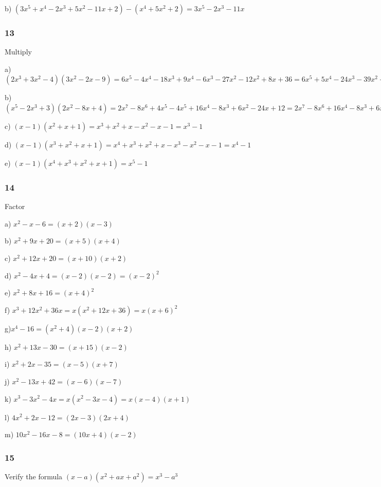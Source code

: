 \documentclass[]{report}
\begin{document}
b) $(3x^5 + x^4 - 2x^3 + 5x^2 - 11x + 2) - (x^4 + 5x^2 + 2) = 3x^5 - 2x^3 - 11x$


\subsubsection{13}
Multiply

a) $(2x^3 + 3x^2 - 4)(3x^2 - 2x - 9) = 6x^5 - 4x^4 - 18x^3 + 9x^4 - 6x^3 - 27x^2 - 12x^2 + 8x + 36 = 6x^5 + 5x^4 - 24x^3 - 39x^2 + 8x + 36$

b) $(x^5 - 2x^3 + 3)(2x^2 - 8x + 4) = 2x^7 - 8x^6 + 4x^5 - 4x^5 + 16x^4 - 8x^3 + 6x^2 - 24x + 12 =  2x^7 - 8x^6 + 16x^4 - 8x^3 + 6x^2 - 24x + 12$

c) $(x-1)(x^2 + x + 1) = x^3 + x^2 + x - x^2 - x - 1 = x^3 - 1$

d) $(x-1)(x^3 + x^2 + x + 1) = x^4 + x^3 + x^2 + x - x^3 - x^2 - x - 1 = x^4 -1$

e) $(x-1)(x^4+x^3+x^2+x+1) = x^5 - 1$

\subsubsection{14}

Factor 

a) $x^2 -x - 6 = (x+2)(x-3)$

b) $x^2 + 9x + 20 = (x + 5)(x + 4)$

c) $x^2 + 12x + 20 = (x + 10)(x + 2)$

d) $x^2 -4x + 4 = (x-2)(x-2) = (x-2)^2$

e) $x^2 + 8x + 16 = (x+4)^2$

f) $x^3 + 12x^2 + 36x = x(x^2 + 12x + 36) = x(x+6)^2$

g)$x^4 - 16 = (x^2+4)(x-2)(x+2)$

h) $x^2 + 13x - 30 = (x+15)(x-2)$

i) $x^2 + 2x - 35 =  (x-5)(x+7)$

j) $x^2 - 13x + 42 = (x - 6)(x - 7)$

k) $x^3 - 3x^2 - 4x = x(x^2 - 3x - 4) = x(x-4)(x + 1)$

l) $4x^2 + 2x - 12 = (2x - 3)(2x+4) $

m) $10x^2 - 16x - 8 = (10x + 4)(x - 2)$

\subsubsection{15}

Verify the formula $(x-a)(x^2 + ax + a^2) = x^3 - a^3$
\end{document}

